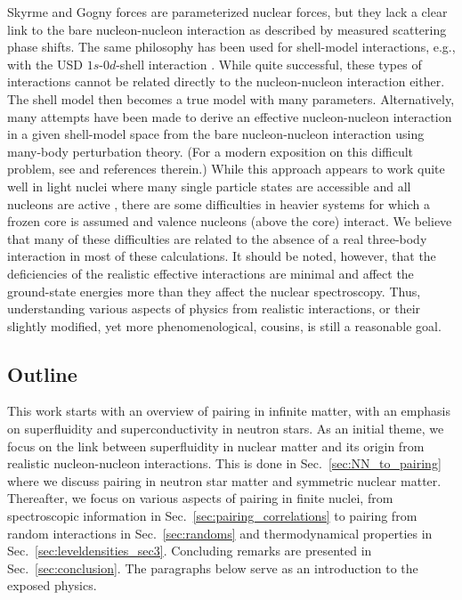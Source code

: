 \documentclass[preprint,rmp,aps,floatfix]{revtex4}
\begin{document}
Skyrme and Gogny forces are parameterized nuclear forces, but they
lack a clear link to the bare nucleon-nucleon interaction as
described by measured scattering phase shifts.  The same philosophy 
has been used for shell-model interactions, e.g., with the
USD $1s$-$0d$-shell interaction \cite{wilden}. While quite
successful, these types of interactions cannot be related 
directly to the nucleon-nucleon interaction either. The shell model
then becomes a true model with many parameters. Alternatively, 
many attempts have been made to derive an effective nucleon-nucleon
interaction in a given shell-model space from the bare nucleon-nucleon
interaction using many-body perturbation theory. (For a modern exposition
on this difficult problem, see \cite{mhj_95} and references therein.)
While this approach appears to work quite well in light nuclei
where many single particle states are accessible and all nucleons
are active \cite{barrett}, there are some difficulties in heavier
systems for which a frozen core is assumed and valence nucleons
(above the core) interact.  We believe that 
many of these difficulties are related to the absence of a real
three-body interaction in most of these calculations. It should
be noted, however, that the deficiencies of the realistic effective
interactions are minimal and affect the ground-state energies more
than they affect the nuclear spectroscopy. Thus, understanding 
various aspects of physics from realistic interactions, or their 
slightly modified, yet more phenomenological, cousins,
is still a reasonable goal. 


\subsection{Outline}

This work starts with an overview of pairing in infinite matter, with an 
emphasis on superfluidity and superconductivity in neutron stars.
As an initial theme, we focus on the link between superfluidity 
in nuclear matter 
and its origin from realistic nucleon-nucleon interactions. 
This is done 
in Sec.~\ref{sec:NN_to_pairing} where we discuss pairing in neutron star
matter and symmetric nuclear matter.
Thereafter, we focus on various aspects of pairing in finite nuclei, from
spectroscopic information in Sec.~\ref{sec:pairing_correlations}
to pairing from random interactions in Sec.~\ref{sec:randoms}
and thermodynamical properties in Sec.~\ref{sec:leveldensities_sec3}.
Concluding remarks are presented in Sec.~\ref{sec:conclusion}.
The paragraphs below serve as an introduction to the  exposed physics.
\end{document}
